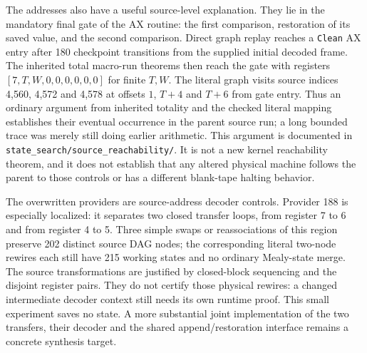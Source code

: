 The addresses also have a useful source-level explanation. They lie in the
mandatory final gate of the AX routine: the first comparison, restoration of
its saved value, and the second comparison. Direct graph replay reaches a
\texttt{Clean} AX entry after 180 checkpoint transitions from the supplied
initial decoded frame. The inherited total macro-run theorems then reach the
gate with registers $[7,T,W,0,0,0,0,0,0]$ for finite $T,W$. The literal graph
visits source indices 4,560, 4,572 and 4,578 at offsets $1$, $T+4$ and $T+6$
from gate entry. Thus an ordinary argument from inherited totality and the
checked literal mapping establishes their eventual occurrence in the parent
source run; a long bounded trace was merely still doing earlier arithmetic.
This argument is documented in
\texttt{state\_search/source\_reachability/}. It is not a new kernel
reachability theorem, and it does not establish that any altered physical
machine follows the parent to those controls or has a different blank-tape
halting behavior.

The overwritten providers are source-address decoder controls. Provider 188
is especially localized: it separates two closed transfer loops, from
register 7 to 6 and from register 4 to 5. Three simple swaps or reassociations
of this region preserve 202 distinct source DAG nodes; the corresponding
literal two-node rewires each still have 215 working states and no ordinary
Mealy-state merge. The source transformations are justified by closed-block
sequencing and the disjoint register pairs. They do not certify those physical
rewires: a changed intermediate decoder context still needs its own runtime
proof. This small experiment saves no state. A more substantial joint
implementation of the two transfers, their decoder and the shared
append/restoration interface remains a concrete synthesis target.

